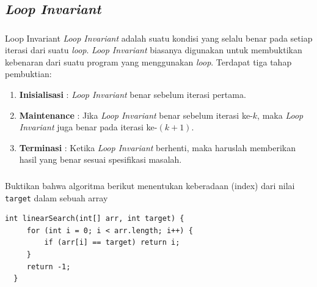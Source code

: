 \documentclass{../praktikum-ppt}
\begin{document}
    \subsection{\textit{Loop Invariant}}
    \begin{frame}
      \frametitle{\insertsection}
      \framesubtitle{\insertsubsection}
      \begin{block}{Loop Invariant}
        \textit{Loop Invariant} adalah suatu kondisi yang selalu benar pada setiap iterasi dari suatu \textit{loop}. \textit{Loop Invariant} biasanya digunakan untuk membuktikan kebenaran dari suatu program yang menggunakan \textit{loop}.
        Terdapat tiga tahap pembuktian:
        \begin{enumerate}
          \item \textbf{Inisialisasi} : \textit{Loop Invariant} benar sebelum iterasi pertama.
          \item \textbf{Maintenance} : Jika \textit{Loop Invariant} benar sebelum iterasi ke-$k$, maka \textit{Loop Invariant} juga benar pada iterasi ke-$(k+1)$.
          \item \textbf{Terminasi} : Ketika \textit{Loop Invariant} berhenti, maka haruslah memberikan hasil yang benar sesuai spesifikasi masalah.
        \end{enumerate}
      \end{block}
    \end{frame}

    \begin{frame}[fragile]
      \frametitle{\insertsection}
      \framesubtitle{\insertsubsection}
      \begin{contoh}
        Buktikan bahwa algoritma berikut menentukan keberadaan (index) dari nilai \texttt{target} dalam sebuah array
      \end{contoh}
      \begin{lstlisting}[caption={Linear Search},captionpos=b]
  int linearSearch(int[] arr, int target) {
     for (int i = 0; i < arr.length; i++) {
         if (arr[i] == target) return i; 
     }
     return -1; 
  } 
      \end{lstlisting}
    \end{frame}
\end{document}
